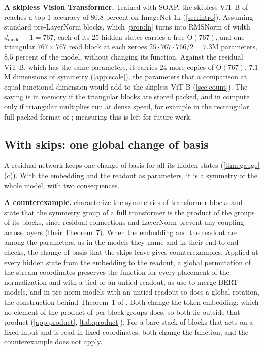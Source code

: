 \documentclass[10pt]{article}
\theoremstyle{definition}
\theoremstyle{remark}
\newcommand{\dm}{d_{\mathrm{model}}}
\newcommand{\Ort}{\mathrm{O}}
\newcommand{\para}[1]{\smallskip\noindent\textbf{#1}\hspace{0.5em}}
\begin{document}
\para{A skipless Vision Transformer.} Trained with SOAP, the skipless ViT-B of \citet{ji2026cutting} reaches a top-1 accuracy of $80.8$ percent on ImageNet-1k (\cref{sec:intro}). Assuming standard pre-LayerNorm blocks, which \cref{prop:ln} turns into RMSNorm of width $\dm - 1 = 767$, each of its $25$ hidden states carries a free $\Ort(767)$, and one triangular $767 \times 767$ read block at each zeroes $25 \cdot 767 \cdot 766/2 = 7.3$M parameters, $8.5$ percent of the model, without changing its function. Against the residual ViT-B, which has the same parameters, it carries $24$ more copies of $\Ort(767)$, $7.1$M dimensions of symmetry (\cref{app:scale}), the parameters that a comparison at equal functional dimension would add to the skipless ViT-B (\cref{sec:count}). The saving is in memory if the triangular blocks are stored packed, and in compute only if triangular multiplies run at dense speed, for example in the rectangular full packed format of \citet{gustavson2010rfp}; measuring this is left for future work.

\subsection{With skips: one global change of basis}\label{sec:global}

A residual network keeps one change of basis for all its hidden states (\cref{thm:gauge}(c)). With the embedding and the readout as parameters, it is a symmetry of the whole model, with two consequences.

\para{A counterexample.} \citet{wang2025gauge} characterize the symmetries of transformer blocks and state that the symmetry group of a full transformer is the product of the groups of its blocks, since residual connections and LayerNorm prevent any coupling across layers (their Theorem~7). When the embedding and the readout are among the parameters, as in the models they name and in their end-to-end checks, the change of basis that the skips leave gives counterexamples. Applied at every hidden state from the embedding to the readout, a global permutation of the stream coordinates preserves the function for every placement of the normalization and with a tied or an untied readout, as \citet[Section~3.3]{verma2024merging} use to merge BERT models, and in pre-norm models with an untied readout so does a global rotation, the construction behind Theorem~1 of \citet{ashkboos2024slicegpt}. Both change the token embedding, which no element of the product of per-block groups does, so both lie outside that product (\cref{app:product}, \cref{tab:product}). For a bare stack of blocks that acts on a fixed input and is read in fixed coordinates, both change the function, and the counterexample does not apply.
\end{document}
